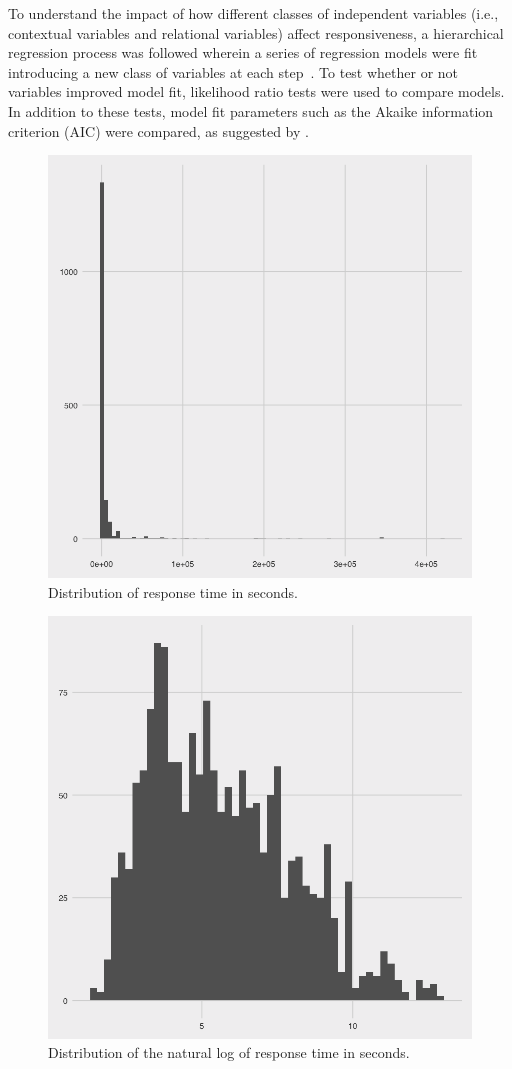 \documentclass[12pt]{nuthesis}	%
\begin{document}
To understand the impact of how different classes of independent variables (i.e., contextual variables and relational variables) affect responsiveness, a hierarchical regression process was followed wherein a series of regression models were fit introducing a new class of variables at each step~\citep{gurnsey2017statistics}. To test whether or not variables improved model fit, likelihood ratio tests were used to compare models. In addition to these tests, model fit parameters such as the Akaike information criterion (AIC) were compared, as suggested by \citet{gelman2007data}.

\begin{figure}[h]
\centering
\includegraphics[width=.7\textwidth]{figures/response_time_distribution}
\caption{Distribution of response time in seconds.}
\label{fig:response_time}
\end{figure}

\begin{figure}[h]
\centering
\includegraphics[width=.7\textwidth]{figures/log_response_time_distribution}
\caption{Distribution of the natural log of response time in seconds.}
\label{fig:log_response_time}
\end{figure}
\end{document}
